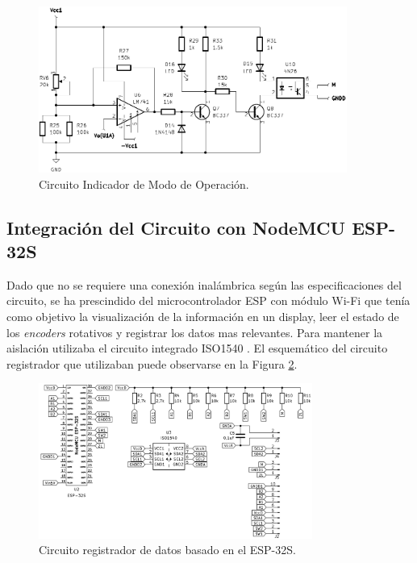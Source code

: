 \begin{figure}[H]
    \centering
    \includegraphics[width=0.9\textwidth]{./imagenes/modo_operacion.PNG}
    \caption{Circuito Indicador de Modo de Operación.}
    \label{F:modo_operacion}
\end{figure}

\subsection{Integración del Circuito con NodeMCU ESP-32S}
Dado que no se requiere una conexión inalámbrica según las especificaciones del circuito, se ha prescindido del microcontrolador ESP con módulo Wi-Fi que tenía como objetivo la visualización de la información en un display, leer el estado de los \textit{encoders} rotativos y registrar los datos mas relevantes. Para mantener la aislación utilizaba el circuito integrado ISO1540 \cite{ISO1540}. El esquemático del circuito registrador que utilizaban puede observarse en la Figura \ref{F:ESP_32S}.\par
\begin{figure}[H]
    \centering
    \includegraphics[width=0.8\textwidth]{./imagenes/ESP_32S.png}
    \caption{Circuito registrador de datos basado en el ESP-32S.}
    \label{F:ESP_32S}
\end{figure}

